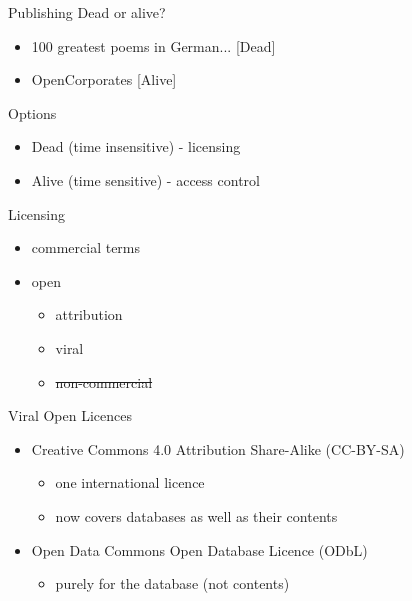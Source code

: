 \documentclass{beamer}
\begin{document}
\begin{frame}{Publishing}
Dead or alive?
\begin{itemize}
\item 100 greatest poems in German... [Dead]
\item OpenCorporates [Alive]
\end{itemize}
Options
\begin{itemize}
\item Dead (time insensitive) - licensing
\item Alive (time sensitive) - access control
\end{itemize}
  
\end{frame}

\begin{frame}{Licensing}
  \begin{itemize}
  \item commercial terms
  \item open
    \begin{itemize}
    \item attribution
    \item viral
    \item \sout{non-commercial}
    \end{itemize}
  \end{itemize}
\end{frame}

\begin{frame}{Viral Open Licences}
  \begin{itemize}
  \item Creative Commons 4.0 Attribution Share-Alike (CC-BY-SA)
    \begin{itemize}
    \item one international licence
    \item now covers databases as well as their contents
    \end{itemize}
  \item Open Data Commons Open Database Licence (ODbL)
    \begin{itemize}
    \item purely for the database (not contents)
    \end{itemize}
  \end{itemize}
\end{frame}
\end{document}
